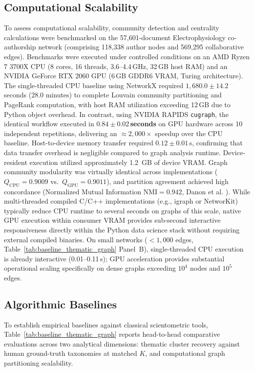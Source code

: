 \documentclass[preprint,12pt]{elsarticle}
\begin{document}
\subsection{Computational Scalability}
To assess computational scalability, community detection and centrality calculations were benchmarked on the 57,601-document Electrophysiology co-authorship network (comprising 118,338 author nodes and 569,295 collaborative edges). Benchmarks were executed under controlled conditions on an AMD Ryzen 7 3700X CPU (8 cores, 16 threads, 3.6--4.4\,GHz, 32\,GB host RAM) and an NVIDIA GeForce RTX 2060 GPU (6\,GB GDDR6 VRAM, Turing architecture). The single-threaded CPU baseline using NetworkX required $1{,}680.0 \pm 14.2$\,seconds (28.0 minutes) to complete Louvain community partitioning and PageRank computation, with host RAM utilization exceeding 12\,GB due to Python object overhead. In contrast, using NVIDIA RAPIDS \texttt{cugraph}, the identical workflow executed in \textbf{$0.84 \pm 0.02$\,seconds} on GPU hardware across 10 independent repetitions, delivering an $\approx 2{,}000\times$ speedup over the CPU baseline. Host-to-device memory transfer required $0.12 \pm 0.01$\,s, confirming that data transfer overhead is negligible compared to graph analysis runtime. Device-resident execution utilized approximately 1.2~GB of device VRAM. Graph community modularity was virtually identical across implementations ($Q_{\text{CPU}} = 0.9009$ vs.\ $Q_{\text{GPU}} = 0.9011$), and partition agreement achieved high concordance (Normalized Mutual Information $\text{NMI} = 0.942$, Danon et al. \cite{danon2005comparing}). While multi-threaded compiled C/C++ implementations (e.g., igraph or NetworKit) typically reduce CPU runtime to several seconds on graphs of this scale, native GPU execution within consumer VRAM provides sub-second interactive responsiveness directly within the Python data science stack without requiring external compiled binaries. On small networks ($<1{,}000$ edges, Table~\ref{tab:baseline_thematic_graph} Panel~B), single-threaded CPU execution is already interactive (0.01--0.11\,s); GPU acceleration provides substantial operational scaling specifically on dense graphs exceeding $10^4$ nodes and $10^5$ edges.

\subsection{Algorithmic Baselines}
\label{sec:head_to_head_baselines}
To establish empirical baselines against classical scientometric tools, Table~\ref{tab:baseline_thematic_graph} reports head-to-head comparative evaluations across two analytical dimensions: thematic cluster recovery against human ground-truth taxonomies at matched $K$, and computational graph partitioning scalability.
\end{document}
